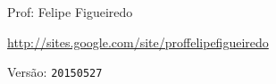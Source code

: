 \documentclass[a4paper]{article}
\begin{document}
\parbox[c]{.825\textwidth}{\raggedright%
{Prof: Felipe Figueiredo\par}
{\url{http://sites.google.com/site/proffelipefigueiredo}\par}
}

Versão: \verb|20150527|



\section{}
\end{document}
